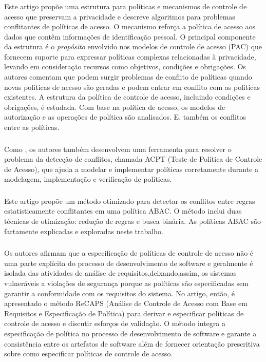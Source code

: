 \subsubsection{ }
Este artigo propõe uma estrutura para políticas e mecanismos de controle de acesso que preservam a privacidade e descreve algoritmos para problemas conflitantes de políticas de acesso. O mecanismo reforça a política de acesso aos dados que contêm informações de identificação pessoal. O principal componente da estrutura é o \textit{propósito} envolvido nos modelos de controle de acesso (PAC) que fornecem suporte para expressar políticas complexas relacionadas à privacidade, levando em consideração recursos como objetivos, condições e obrigações. Os autores comentam que podem surgir problemas de conflito de políticas quando novas políticas de acesso são geradas e podem entrar em conflito com as políticas existentes. A estrutura da política de controle de acesso, incluindo condições e obrigações, é estudada. Com base na política de acesso, os modelos de autorização e as operações de política são analisados. E, também os conflitos entre as políticas.

\subsubsection{}
Como , os autores também desenvolvem uma ferramenta para resolver o problema da detecção de conflitos, chamada  ACPT (Teste de Política de Controle de Acesso), que ajuda a modelar e implementar políticas corretamente durante a modelagem, implementação e verificação de políticas.

\subsubsection{}
Este artigo propõe um método otimizado para detectar os conflitos entre regras estatisticamente conflitantes em uma política ABAC. O método inclui duas técnicas de otimização: redução de regras e busca binária. As políticas ABAC são fartamente explicadas e exploradas neste trabalho.

\subsubsection{ }
Os autores afirmam que a especificação de políticas de controle de acesso não é uma parte explícita do processo de desenvolvimento de software e geralmente é isolada das atividades de análise de requisitos,deixando,assim, os sistemas vulneráveis ​​a violações de segurança porque as políticas são especificadas sem garantir a conformidade com os requisitos do sistema. No artigo, então, é apresentado o método ReCAPS (Análise de Controle de Acesso com Base em Requisitos e Especificação de Política) para derivar e especificar políticas de controle de acesso e discutir esforços de validação. O método integra a especificação de política no processo de desenvolvimento de software e garante a consistência entre os artefatos de software além de fornecer orientação prescritiva sobre como especificar políticas de controle de acesso.

